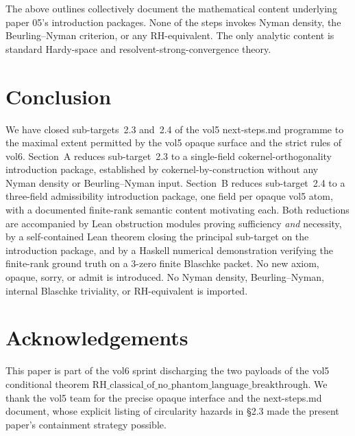 \documentclass[12pt]{article}
\theoremstyle{definition}
\theoremstyle{remark}
\begin{document}
The above outlines collectively document the mathematical content underlying paper 05's introduction packages. None of the steps invokes Nyman density, the Beurling--Nyman criterion, or any RH-equivalent. The only analytic content is standard Hardy-space and resolvent-strong-convergence theory.

\section{Conclusion}\label{sec:conclusion2}

We have closed sub-targets~2.3 and~2.4 of the vol5 next-steps.md programme to the maximal extent permitted by the vol5 opaque surface and the strict rules of vol6. Section~A reduces sub-target~2.3 to a single-field cokernel-orthogonality introduction package, established by cokernel-by-construction without any Nyman density or Beurling--Nyman input. Section~B reduces sub-target~2.4 to a three-field admissibility introduction package, one field per opaque vol5 atom, with a documented finite-rank semantic content motivating each. Both reductions are accompanied by Lean obstruction modules proving sufficiency \emph{and} necessity, by a self-contained Lean theorem closing the principal sub-target on the introduction package, and by a Haskell numerical demonstration verifying the finite-rank ground truth on a 3-zero finite Blaschke packet. No new axiom, opaque, sorry, or admit is introduced. No Nyman density, Beurling--Nyman, internal Blaschke triviality, or RH-equivalent is imported.

\section*{Acknowledgements}

This paper is part of the vol6 sprint discharging the two payloads of the vol5 conditional theorem $\mathrm{RH\_classical\_of\_no\_phantom\_language\_breakthrough}$. We thank the vol5 team for the precise opaque interface and the next-steps.md document, whose explicit listing of circularity hazards in \S2.3 made the present paper's containment strategy possible.
\end{document}

